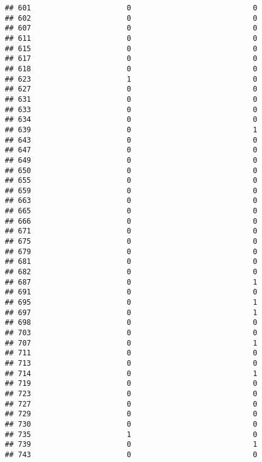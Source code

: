 \documentclass[
]{article}
\begin{document}
\begin{verbatim}
## 601                      0                            0
## 602                      0                            0
## 607                      0                            0
## 611                      0                            0
## 615                      0                            0
## 617                      0                            0
## 618                      0                            0
## 623                      1                            0
## 627                      0                            0
## 631                      0                            0
## 633                      0                            0
## 634                      0                            0
## 639                      0                            1
## 643                      0                            0
## 647                      0                            0
## 649                      0                            0
## 650                      0                            0
## 655                      0                            0
## 659                      0                            0
## 663                      0                            0
## 665                      0                            0
## 666                      0                            0
## 671                      0                            0
## 675                      0                            0
## 679                      0                            0
## 681                      0                            0
## 682                      0                            0
## 687                      0                            1
## 691                      0                            0
## 695                      0                            1
## 697                      0                            1
## 698                      0                            0
## 703                      0                            0
## 707                      0                            1
## 711                      0                            0
## 713                      0                            0
## 714                      0                            1
## 719                      0                            0
## 723                      0                            0
## 727                      0                            0
## 729                      0                            0
## 730                      0                            0
## 735                      1                            0
## 739                      0                            1
## 743                      0                            0

\end{verbatim}
\end{document}
